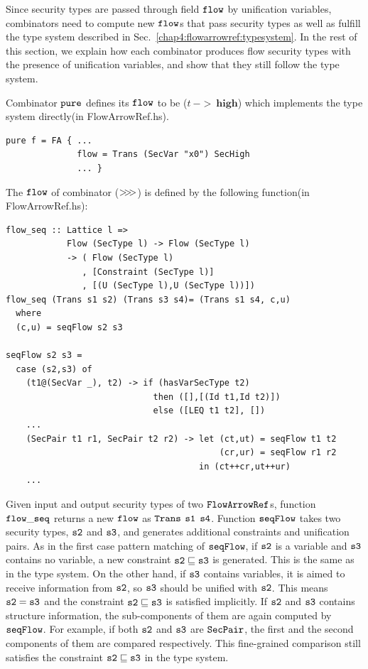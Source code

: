 \documentclass[a4paper]{report}
\newcommand{\arrowop}[1]{$#1\negthickspace #1\negthickspace #1$}
\newcommand{\co}[1]{$\cod{#1}$}
\begin{document}
Since security types are passed through field \co{flow} by unification variables,
combinators need to compute new \co{flow}s that pass 
security types as well as fulfill the type system described in Sec.~\ref{chap4:flowarrowref:typesystem}.
In the rest of this section, we explain how each combinator produces flow security types with the presence
of unification variables, and show that they still follow the type system.

Combinator \co{pure} defines its \co{flow} to be ($t~->~\mathbf{high}$) which implements the type system
directly(in FlowArrowRef.hs).
\begin{Verbatim}[fontsize=\footnotesize]
pure f = FA { ...
              flow = Trans (SecVar "x0") SecHigh
              ... }
\end{Verbatim}
The \co{flow} of combinator (\arrowop{>}) is defined by the following function(in FlowArrowRef.hs):
\begin{Verbatim}[fontsize=\footnotesize]
flow_seq :: Lattice l => 
            Flow (SecType l) -> Flow (SecType l)
            -> ( Flow (SecType l)
               , [Constraint (SecType l)]
               , [(U (SecType l),U (SecType l))])
flow_seq (Trans s1 s2) (Trans s3 s4)= (Trans s1 s4, c,u)
  where
  (c,u) = seqFlow s2 s3

seqFlow s2 s3 =
  case (s2,s3) of
    (t1@(SecVar _), t2) -> if (hasVarSecType t2)
                             then ([],[(Id t1,Id t2)])
                             else ([LEQ t1 t2], [])
    ...
    (SecPair t1 r1, SecPair t2 r2) -> let (ct,ut) = seqFlow t1 t2
                                          (cr,ur) = seqFlow r1 r2
                                      in (ct++cr,ut++ur)
    ...
\end{Verbatim}
Given input and output security types of two \co{FlowArrowRef}s, function \co{flow\_seq} returns a new \co{flow}
as \co{Trans} \co{s1} \co{s4}.
Function \co{seqFlow} takes two security types, \co{s2} and \co{s3}, and generates additional constraints and 
unification pairs. 
As in the first case pattern matching of \co{seqFlow}, if \co{s2} is a variable and \co{s3} contains no variable, 
a new constraint $\mathtt{s2}\sqsubseteq \mathtt{s3}$ is generated. This is the same as in the type system.
On the other hand, if \co{s3} contains variables, it is aimed to receive information from \co{s2}, so \co{s3}
should be unified with \co{s2}. This means $\mathtt{s2}=\mathtt{s3}$ and the constraint 
$\mathtt{s2}\sqsubseteq \mathtt{s3}$ is satisfied implicitly. 
If \co{s2} and \co{s3} contains structure information, the sub-components of them are again computed by \co{seqFlow}.
For example, if both \co{s2} and \co{s3} are \co{SecPair}, the first and the second components of them are
compared respectively. 
This fine-grained comparison still satisfies the constraint $\mathtt{s2}\sqsubseteq \mathtt{s3}$ in the type system.
\end{document}
